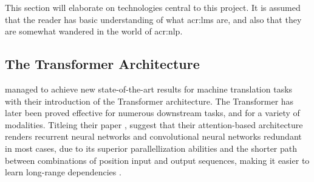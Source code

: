 This section will elaborate on technologies central to this project. It is assumed that the reader has basic understanding of what \glspl{acr:lm} are, and also that they are somewhat wandered in the world of \acrfull{acr:nlp}.

\subsection{The Transformer Architecture}

\cite{vaswaniAttentionAllYou2017a} managed to achieve new state-of-the-art results for machine translation tasks with their introduction of the Transformer architecture. The Transformer has later been proved effective for numerous downstream tasks, and for a variety of modalities. Titleing their paper , \citeauthor{vaswaniAttentionAllYou2017a} suggest that their attention-based architecture renders recurrent neural networks and convolutional neural networks redundant in most cases, due to its superior parallellization abilities and the shorter path between combinations of position input and output sequences, making it easier to learn long-range dependencies \citep[6]{vaswaniAttentionAllYou2017a}.

